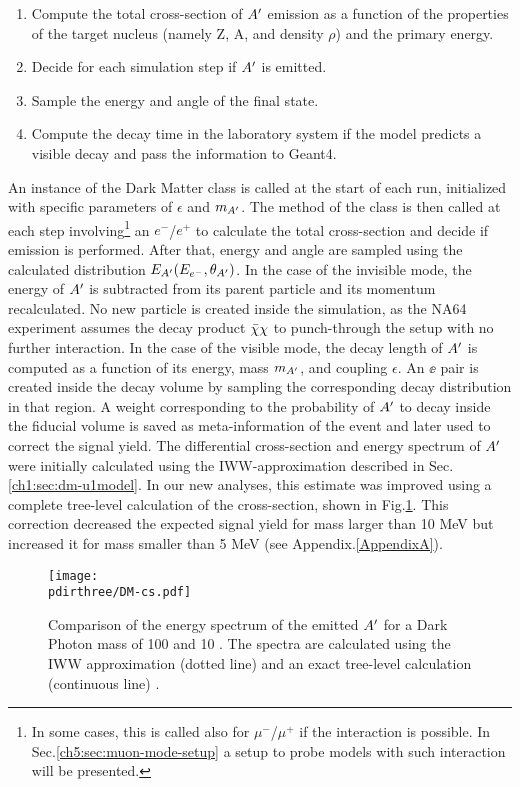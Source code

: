 \begin{enumerate}
\item Compute the total cross-section of $A'$ emission as a function of the properties of the target nucleus (namely Z, A, and density $\rho$) and the primary energy.
\item Decide for each simulation step if $A'$ is emitted.
\item Sample the energy and angle of the final state.
\item Compute the decay time in the laboratory system if the model predicts a visible decay and pass the information to Geant4.
\end{enumerate}

An instance of the Dark Matter class is called at the start of each run, initialized with specific parameters of $\epsilon$ and $m_{A'}$. The method of the class is then called at each step involving\footnote{In some cases, this is called also for $\mu^-$/$\mu^+$ if the interaction is possible. In Sec.\ref{ch5:sec:muon-mode-setup} a setup to probe models with such interaction will be presented.} an $e^-$/$e^+$ to calculate the total cross-section and decide if emission is performed. After that, energy and angle are sampled using the calculated distribution $E_{A'}(E_{e^-}, \theta_{A'})$. In the case of the invisible mode, the energy of $A'$ is subtracted from its parent particle and its momentum recalculated. No new particle is created inside the simulation, as the NA64 experiment assumes the decay product $\bar{\chi} \chi$ to punch-through the setup with no further interaction. In the case of the visible mode, the decay length of $A'$ is computed as a function of its energy, mass $m_{A'}$, and coupling $\epsilon$. An $\ee$ pair is created inside the decay volume by sampling the corresponding decay distribution in that region. A weight corresponding to the probability of $A'$ to decay inside the fiducial volume is saved as meta-information of the event and later used to correct the signal yield.
The differential cross-section and energy spectrum of $A'$ were initially calculated using the IWW-approximation described in Sec.\ref{ch1:sec:dm-u1model}. In our new analyses, this estimate was improved using a complete tree-level calculation of the cross-section, shown in Fig.\ref{fig:dm-iww-tl}. This correction decreased the expected signal yield for mass larger than 10 MeV but increased it for mass smaller than 5 MeV \cite{DMsimulation} (see Appendix.\ref{AppendixA}).

\begin{figure}[htb!]
  \centering
  \texttt{[image: \\pdirthree/DM-cs.pdf]}
  \caption[IWW vs tree-level energy spectra]{Comparison of the energy spectrum of the emitted $A'$ for a Dark Photon mass of 100 \mev and 10 \mev. The spectra are calculated using the IWW approximation (dotted line) and an exact tree-level calculation (continuous line) \cite{DMsimulation}.}
  \label{fig:dm-iww-tl}
\end{figure}


